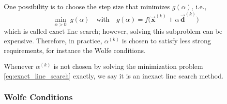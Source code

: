 \documentclass[9pt, headings=standardclasses, parskip=half]{scrartcl}
\renewcommand{\emph}[1]{\textcolor{mypurple}{#1}}
\newcommand{\vect}[1]{\vec{\boldsymbol{#1}}}
\begin{document}
One possibility is to choose the step size that minimizes \(g(\alpha)\), i.e.,
\begin{equation}
\label{eq:exact_line_search}
\min_{\alpha > 0} \; g(\alpha) \quad \text{with} \quad g(\alpha)=f\bigl(\vect{x}^{(k)} + \alpha\, \vect{d}^{(k)}\bigr) %
\end{equation}
which is called \emph{exact line search}; however, solving this subproblem can be expensive. Therefore, in practice, \(\alpha^{(k)}\) is chosen to satisfy less strong requirements, for instance the Wolfe conditions.

\begin{remark}
Whenever \(\alpha^{(k)}\) is \emph{not} chosen by solving the minimization problem \eqref{eq:exact_line_search} exactly, we say it is an \emph{inexact line search} method.
\end{remark}



\subsubsection{Wolfe Conditions}


\end{document}
